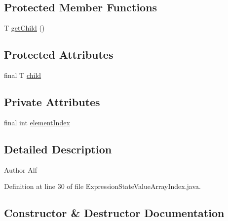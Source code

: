 \subsection*{Protected Member Functions}
\begin{DoxyCompactItemize}
\item 
T \hyperlink{classgov_1_1nasa_1_1jpf_1_1inspector_1_1server_1_1expression_1_1_expression_state_unary_operator_a150bac338d6557f79ca185d3f6ad6e06}{get\+Child} ()
\end{DoxyCompactItemize}
\subsection*{Protected Attributes}
\begin{DoxyCompactItemize}
\item 
final T \hyperlink{classgov_1_1nasa_1_1jpf_1_1inspector_1_1server_1_1expression_1_1_expression_state_unary_operator_a66041b1f569a361549e28a00f7ca5f2f}{child}
\end{DoxyCompactItemize}
\subsection*{Private Attributes}
\begin{DoxyCompactItemize}
\item 
final int \hyperlink{classgov_1_1nasa_1_1jpf_1_1inspector_1_1server_1_1expression_1_1expressions_1_1_expression_state_value_array_index_a90a2553f285ebf96b2572a89b99ec148}{element\+Index}
\end{DoxyCompactItemize}


\subsection{Detailed Description}
\begin{DoxyAuthor}{Author}
Alf 
\end{DoxyAuthor}


Definition at line 30 of file Expression\+State\+Value\+Array\+Index.\+java.



\subsection{Constructor \& Destructor Documentation}
